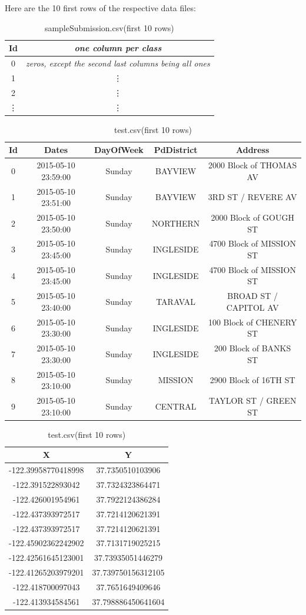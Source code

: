 \documentclass[12pt,a4paper]{scrartcl}
\begin{document}
Here are the 10 first rows of the respective data files:

\begin{table}[htbp]
\centering
\setlength\tabcolsep{2pt}
\begin{tabular}{|cc|}\hline
Id&\textit{one column per class}\\\hline\hline
0&\textit{zeros, except the second last columns being all ones}\\
1&\vdots\\
2&\vdots\\
\vdots&\vdots\\\hline
\end{tabular}
\caption{sampleSubmission.csv(first 10 rows)}
\label{tab:sampleSubmission.csv}
\end{table}

\begin{table}[htbp]
\centering
\footnotesize
\setlength\tabcolsep{2pt}
\begin{tabular}{|ccccc}\hline
Id&Dates&DayOfWeek&PdDistrict&Address\\\hline\hline
0&2015-05-10 23:59:00&Sunday&BAYVIEW&2000 Block of THOMAS AV\\
1&2015-05-10 23:51:00&Sunday&BAYVIEW&3RD ST / REVERE AV\\
2&2015-05-10 23:50:00&Sunday&NORTHERN&2000 Block of GOUGH ST\\
3&2015-05-10 23:45:00&Sunday&INGLESIDE&4700 Block of MISSION ST\\
4&2015-05-10 23:45:00&Sunday&INGLESIDE&4700 Block of MISSION ST\\
5&2015-05-10 23:40:00&Sunday&TARAVAL&BROAD ST / CAPITOL AV\\
6&2015-05-10 23:30:00&Sunday&INGLESIDE&100 Block of CHENERY ST\\
7&2015-05-10 23:30:00&Sunday&INGLESIDE&200 Block of BANKS ST\\
8&2015-05-10 23:10:00&Sunday&MISSION&2900 Block of 16TH ST\\
9&2015-05-10 23:10:00&Sunday&CENTRAL&TAYLOR ST / GREEN ST\\\hline
\end{tabular}
\begin{tabular}{cc|}\hline
X&Y\\\hline\hline
-122.39958770418998&37.7350510103906\\
-122.391522893042&37.7324323864471\\
-122.426001954961&37.7922124386284\\
-122.437393972517&37.7214120621391\\
-122.437393972517&37.7214120621391\\
-122.45902362242902&37.7131719025215\\
-122.42561645123001&37.73935051446279\\
-122.41265203979201&37.739750156312105\\
-122.418700097043&37.7651649409646\\
-122.413934584561&37.798886450641604\\\hline
\end{tabular}
\caption{test.csv(first 10 rows)}
\label{tab:test.csv}
\end{table}
\end{document}
